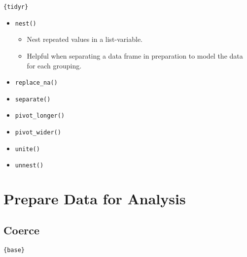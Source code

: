 \documentclass[
]{book}
\providecommand{\tightlist}{%
  \setlength{\itemsep}{0pt}\setlength{\parskip}{0pt}}
\begin{document}
\texttt{\{tidyr\}}

\begin{itemize}
\tightlist
\item
  \texttt{nest()}

  \begin{itemize}
  \tightlist
  \item
    Nest repeated values in a list-variable.
  \item
    Helpful when separating a data frame in preparation to model the data for each grouping.
  \end{itemize}
\item
  \texttt{replace\_na()}
\item
  \texttt{separate()}
\item
  \texttt{pivot\_longer()}
\item
  \texttt{pivot\_wider()}
\item
  \texttt{unite()}
\item
  \texttt{unnest()}
\end{itemize}

\hypertarget{prepare-data-for-analysis}{%
\section{Prepare Data for Analysis}\label{prepare-data-for-analysis}}

\hypertarget{coerce}{%
\subsection{Coerce}\label{coerce}}

\texttt{\{base\}}
\end{document}
